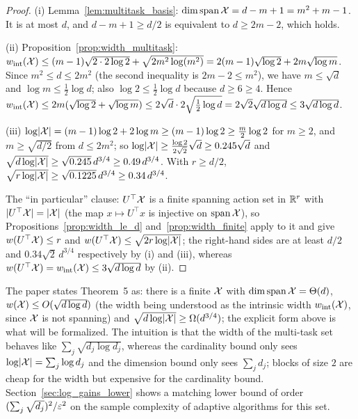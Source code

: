 \begin{proof}
\leanok
{}
(i) Lemma~\ref{lem:multitask_basis}: $\dim\operatorname{span}\mathcal{X} = d - m + 1 = m^2 + m - 1$. It is at most
$d$, and $d - m + 1 \ge d/2$ is equivalent to $d \ge 2m - 2$, which holds.

(ii) Proposition~\ref{prop:width_multitask}:
$w_{\mathrm{int}}(\mathcal{X}) \le (m-1)\sqrt{2\cdot 2\log 2} + \sqrt{2m^2\log(m^2)} = 2(m-1)\sqrt{\log2} + 2m\sqrt{\log m}$.
Since $m^2 \le d \le 2m^2$ (the second inequality is $2m - 2 \le m^2$), we have
$m \le \sqrt d$ and $\log m \le \frac12\log d$; also $\log 2 \le \frac12\log d$ because
$d \ge 6 \ge 4$. Hence
$w_{\mathrm{int}}(\mathcal{X}) \le 2m(\sqrt{\log 2} + \sqrt{\log m}) \le 2\sqrt d\cdot 2\sqrt{\tfrac12\log d}
= 2\sqrt2\sqrt{d\log d} \le 3\sqrt{d\log d}$.

(iii) $\log\lvert \mathcal{X} \rvert = (m-1)\log 2 + 2\log m \ge (m-1)\log2 \ge \frac{m}{2}\log 2$ for
$m\ge2$, and $m \ge \sqrt{d/2}$ from $d \le 2m^2$; so
$\log\lvert \mathcal{X} \rvert \ge \frac{\log 2}{2\sqrt2}\sqrt d \ge 0.245\sqrt d$ and
$\sqrt{d\log\lvert \mathcal{X} \rvert} \ge \sqrt{0.245}\,d^{3/4} \ge 0.49\,d^{3/4}$. With $r \ge d/2$,
$\sqrt{r\log\lvert \mathcal{X} \rvert} \ge \sqrt{0.1225}\,d^{3/4} \ge 0.34\,d^{3/4}$.

The ``in particular'' clause: $U^\top\mathcal{X}$ is a finite spanning action set in $\mathbb{R}^r$ with
$\lvert U^\top\mathcal{X} \rvert = \lvert \mathcal{X} \rvert$ (the map $x \mapsto U^\top x$ is injective on $\operatorname{span}\mathcal{X}$), so
Propositions~\ref{prop:width_le_d} and~\ref{prop:width_finite} apply to it and give
$w(U^\top\mathcal{X}) \le r$ and $w(U^\top\mathcal{X}) \le \sqrt{2r\log\lvert \mathcal{X} \rvert}$; the right-hand sides are
at least $d/2$ and $0.34\sqrt2\,d^{3/4}$ respectively by (i) and (iii), whereas
$w(U^\top\mathcal{X}) = w_{\mathrm{int}}(\mathcal{X}) \le 3\sqrt{d\log d}$ by (ii).
\end{proof}

\begin{remark}
The paper states Theorem~5 as: there is a finite $\mathcal{X}$ with $\dim\operatorname{span}\mathcal{X} = \Theta(d)$,
$w(\mathcal{X}) \le O(\sqrt{d\log d})$ (the width being understood as the intrinsic width
$w_{\mathrm{int}}(\mathcal{X})$, since $\mathcal{X}$ is not spanning) and
$\sqrt{d\log\lvert \mathcal{X} \rvert} \ge \Omega(d^{3/4})$; the
explicit form above is what will be formalized. The intuition is that the width of the
multi-task set behaves like $\sum_j\sqrt{d_j\log d_j}$, whereas the cardinality bound only
sees $\log\lvert \mathcal{X} \rvert = \sum_j\log d_j$ and the dimension bound only sees $\sum_j d_j$; blocks of
size $2$ are cheap for the width but expensive for the cardinality bound. Section~\ref{sec:log_gains_lower}
shows a matching lower bound of order $(\sum_j\sqrt{d_j})^2/\varepsilon^2$ on the sample complexity
of adaptive algorithms for this set.
\end{remark}
